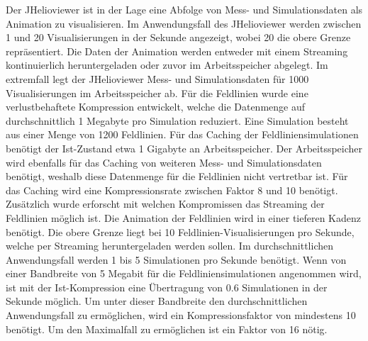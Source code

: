 Der JHelioviewer ist in der Lage eine Abfolge von Mess- und Simulationsdaten als Animation zu visualisieren. Im Anwendungsfall des JHelioviewer werden zwischen 1 und 20 Visualisierungen in der Sekunde angezeigt, wobei 20 die obere Grenze repräsentiert. Die Daten der Animation werden entweder mit einem Streaming kontinuierlich heruntergeladen oder zuvor im Arbeitsspeicher abgelegt. Im extremfall legt der JHelioviewer Mess- und Simulationsdaten für 1000 Visualisierungen im Arbeitsspeicher ab. Für die Feldlinien wurde eine verlustbehaftete Kompression entwickelt, welche die Datenmenge auf durchschnittlich 1 Megabyte pro Simulation reduziert. Eine Simulation besteht aus einer Menge von 1200 Feldlinien. Für das Caching der Feldliniensimulationen benötigt der Ist-Zustand etwa 1 Gigabyte an Arbeitsspeicher. Der Arbeitsspeicher wird ebenfalls für das Caching von weiteren Mess- und Simulationsdaten benötigt, weshalb diese Datenmenge für die Feldlinien nicht vertretbar ist. Für das Caching wird eine Kompressionsrate zwischen Faktor 8 und 10 benötigt. Zusätzlich wurde erforscht mit welchen Kompromissen das Streaming der Feldlinien möglich ist. Die Animation der Feldlinien wird in einer tieferen Kadenz benötigt. Die obere Grenze liegt bei 10 Feldlinien-Visualisierungen pro Sekunde, welche per Streaming heruntergeladen werden sollen. Im durchschnittlichen Anwendungsfall werden 1 bis 5 Simulationen pro Sekunde benötigt. Wenn von einer Bandbreite von 5 Megabit für die Feldliniensimulationen angenommen wird, ist mit der Ist-Kompression eine Übertragung von 0.6 Simulationen in der Sekunde möglich. Um unter dieser Bandbreite den durchschnittlichen Anwendungsfall zu ermöglichen, wird ein Kompressionsfaktor von mindestens 10 benötigt. Um den Maximalfall zu ermöglichen ist ein Faktor von 16 nötig.

